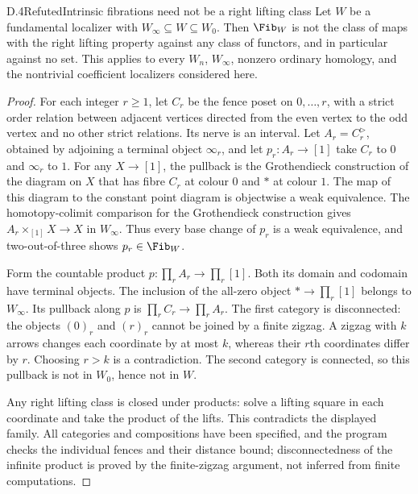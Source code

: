 \begin{claim}{D.4}{Refuted}{Intrinsic fibrations need not be a right lifting class}
Let $W$ be a fundamental localizer with $W_\infty\subseteq W\subseteq W_0$. Then $\Fib_W$ is not the class of maps with the right lifting property against any class of functors, and in particular against no set. This applies to every $W_n$, $W_\infty$, nonzero ordinary homology, and the nontrivial coefficient localizers considered here.
\end{claim}
\begin{proof}
For each integer $r\geq1$, let $C_r$ be the fence poset on $0,\ldots,r$, with a strict order relation between adjacent vertices directed from the even vertex to the odd vertex and no other strict relations. Its nerve is an interval. Let $A_r=C_r^{\triangleright}$, obtained by adjoining a terminal object $\infty_r$, and let $p_r:A_r\to[1]$ take $C_r$ to $0$ and $\infty_r$ to $1$.
For any $X\to[1]$, the pullback is the Grothendieck construction of the diagram on $X$ that has fibre $C_r$ at colour $0$ and $*$ at colour $1$. The map of this diagram to the constant point diagram is objectwise a weak equivalence. The homotopy-colimit comparison for the Grothendieck construction gives $A_r\times_{[1]}X\to X$ in $W_\infty$. Thus every base change of $p_r$ is a weak equivalence, and two-out-of-three shows $p_r\in\Fib_W$.

Form the countable product $p:\prod_rA_r\to\prod_r[1]$. Both its domain and codomain have terminal objects. The inclusion of the all-zero object $*\to\prod_r[1]$ belongs to $W_\infty$. Its pullback along $p$ is $\prod_rC_r\to\prod_rA_r$. The first category is disconnected: the objects $(0)_r$ and $(r)_r$ cannot be joined by a finite zigzag. A zigzag with $k$ arrows changes each coordinate by at most $k$, whereas their $r$th coordinates differ by $r$. Choosing $r>k$ is a contradiction. The second category is connected, so this pullback is not in $W_0$, hence not in $W$.

Any right lifting class is closed under products: solve a lifting square in each coordinate and take the product of the lifts. This contradicts the displayed family. All categories and compositions have been specified, and the program checks the individual fences and their distance bound; disconnectedness of the infinite product is proved by the finite-zigzag argument, not inferred from finite computations.
\end{proof}

